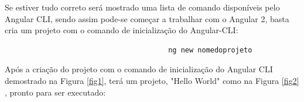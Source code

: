 \documentclass[12pt]{article}
\begin{document}
Se estiver tudo correto será mostrado uma lista de comando disponíveis pelo Angular CLI, sendo assim pode-se começar a trabalhar com o Angular 2, basta cria um projeto com o comando de inicialização do Angular-CLI: 


\begin{verbatim}
                                       ng new nomedoprojeto
\end{verbatim}

Após a criação do projeto com o comando de inicialização do Angular CLI demostrado na Figura \ref{fig1}, terá um projeto, "Hello World" como na Figura \ref{fig2} , pronto para ser executado:

\begin{figure}[H]
	\center
	\caption{}
	\center
\end{figure}
\end{document}

